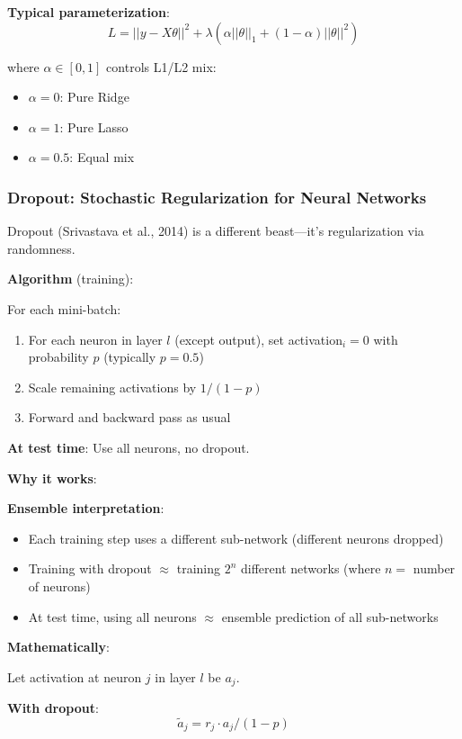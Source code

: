 \documentclass[11pt,oneside]{book}
\begin{document}
\textbf{Typical parameterization}:
\begin{equation}
L = ||y - X\theta||^2 + \lambda(\alpha||\theta||_1 + (1-\alpha)||\theta||^2)
\end{equation}

where $\alpha \in [0, 1]$ controls L1/L2 mix:
\begin{itemize}
    \item $\alpha = 0$: Pure Ridge
    \item $\alpha = 1$: Pure Lasso
    \item $\alpha = 0.5$: Equal mix
\end{itemize}

\subsubsection{Dropout: Stochastic Regularization for Neural Networks}

Dropout (Srivastava et al., 2014) is a different beast—it's regularization via randomness.

\textbf{Algorithm} (training):

For each mini-batch:
\begin{enumerate}
    \item For each neuron in layer $l$ (except output), set activation$_i = 0$ with probability $p$ (typically $p = 0.5$)
    \item Scale remaining activations by $1/(1-p)$
    \item Forward and backward pass as usual
\end{enumerate}

\textbf{At test time}: Use all neurons, no dropout.

\textbf{Why it works}:

\textbf{Ensemble interpretation}:
\begin{itemize}
    \item Each training step uses a different sub-network (different neurons dropped)
    \item Training with dropout $\approx$ training $2^n$ different networks (where $n =$ number of neurons)
    \item At test time, using all neurons $\approx$ ensemble prediction of all sub-networks
\end{itemize}

\textbf{Mathematically}:

Let activation at neuron $j$ in layer $l$ be $a_j$.

\textbf{With dropout}:
\begin{equation}
\tilde{a}_j = r_j \cdot a_j / (1-p)
\end{equation}
\end{document}

